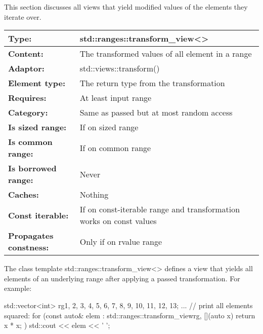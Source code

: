 

This section discusses all views that yield modified values of the elements they iterate over.


\begin{longtable}[c]{|l|l|}
\hline
\textbf{Type:}                 & std::ranges::transform\_view\textless{}\textgreater{} \\ \hline
\endfirsthead
%
\endhead
%
\textbf{Content:}              & The transformed values of all element in a range      \\ \hline
\textbf{Adaptor:}              & std::views::transform()                               \\ \hline
\textbf{Element type:}         & The return type from the transformation               \\ \hline
\textbf{Requires:}             & At least input range                                  \\ \hline
\textbf{Category:}             & Same as passed but at most random access              \\ \hline
\textbf{Is sized range:}       & If on sized range                                     \\ \hline
\textbf{Is common range:}      & If on common range                                    \\ \hline
\textbf{Is borrowed range:}    & Never                                                 \\ \hline
\textbf{Caches:}               & Nothing                                               \\ \hline
\textbf{Const iterable:} & If on const-iterable range and transformation works on const values \\ \hline
\textbf{Propagates constness:} & Only if on rvalue range                               \\ \hline
\end{longtable}

The class template std::ranges::transform\_view<> defines a view that yields all elements of an underlying range after applying a passed transformation. For example:

\begin{cpp}
std::vector<int> rg{1, 2, 3, 4, 5, 6, 7, 8, 9, 10, 11, 12, 13};
...
// print all elements squared:
for (const auto& elem : std::ranges::transform_view{rg, [](auto x) {
							return x * x;
					}}) {
	std::cout << elem << ' ';
}
\end{cpp}

